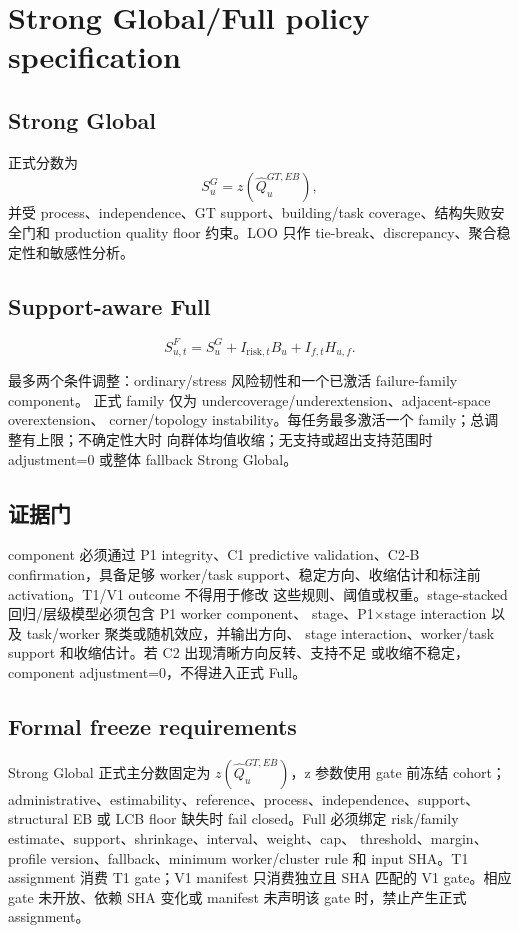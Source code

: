 \section{Strong Global/Full policy specification}

\subsection{Strong Global}

正式分数为
\[
S^G_u=z(\widehat Q^{GT,EB}_u),
\]
并受 process、independence、GT support、building/task coverage、结构失败安全门和
production quality floor 约束。LOO 只作 tie-break、discrepancy、聚合稳定性和敏感性分析。

\subsection{Support-aware Full}

\[
S^F_{u,t}=S^G_u+I_{\mathrm{risk},t}B_u+I_{f,t}H_{u,f}.
\]

最多两个条件调整：ordinary/stress 风险韧性和一个已激活 failure-family component。
正式 family 仅为 undercoverage/underextension、adjacent-space overextension、
corner/topology instability。每任务最多激活一个 family；总调整有上限；不确定性大时
向群体均值收缩；无支持或超出支持范围时 adjustment=0 或整体 fallback Strong Global。

\subsection{证据门}

component 必须通过 P1 integrity、C1 predictive validation、C2-B confirmation，具备足够
worker/task support、稳定方向、收缩估计和标注前 activation。T1/V1 outcome 不得用于修改
这些规则、阈值或权重。stage-stacked 回归/层级模型必须包含 P1 worker component、
stage、P1\(\times\)stage interaction 以及 task/worker 聚类或随机效应，并输出方向、
stage interaction、worker/task support 和收缩估计。若 C2 出现清晰方向反转、支持不足
或收缩不稳定，component adjustment=0，不得进入正式 Full。

\subsection{Formal freeze requirements}

Strong Global 正式主分数固定为 \(z(\widehat Q^{GT,EB}_u)\)，z 参数使用 gate 前冻结 cohort；
administrative、estimability、reference、process、independence、support、structural EB 或 LCB floor
缺失时 fail closed。Full 必须绑定 risk/family estimate、support、shrinkage、interval、weight、cap、
threshold、margin、profile version、fallback、minimum worker/cluster rule 和 input SHA。T1 assignment
消费 T1 gate；V1 manifest 只消费独立且 SHA 匹配的 V1 gate。相应 gate 未开放、依赖 SHA 变化或
manifest 未声明该 gate 时，禁止产生正式 assignment。
